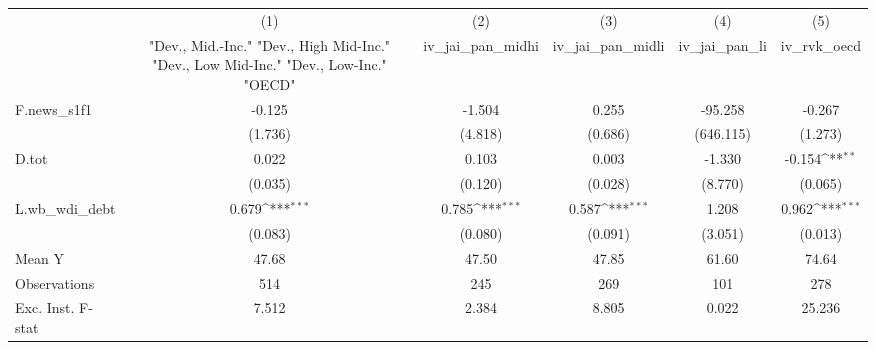 {
\def\sym#1{\ifmmode^{#1}\else\(^{#1}\)\fi}
\begin{tabular}{l*{5}{c}}
\toprule
            &\multicolumn{1}{c}{(1)}&\multicolumn{1}{c}{(2)}&\multicolumn{1}{c}{(3)}&\multicolumn{1}{c}{(4)}&\multicolumn{1}{c}{(5)}\\
            &\multicolumn{1}{c}{ "Dev., Mid.-Inc." "Dev., High Mid-Inc." "Dev., Low Mid-Inc." "Dev., Low-Inc." "OECD" }&\multicolumn{1}{c}{iv\_jai\_pan\_midhi}&\multicolumn{1}{c}{iv\_jai\_pan\_midli}&\multicolumn{1}{c}{iv\_jai\_pan\_li}&\multicolumn{1}{c}{iv\_rvk\_oecd}\\
\midrule
F.news\_s1f1 &      -0.125         &      -1.504         &       0.255         &     -95.258         &      -0.267         \\
            &     (1.736)         &     (4.818)         &     (0.686)         &   (646.115)         &     (1.273)         \\
\addlinespace
D.tot       &       0.022         &       0.103         &       0.003         &      -1.330         &      -0.154\sym{**} \\
            &     (0.035)         &     (0.120)         &     (0.028)         &     (8.770)         &     (0.065)         \\
\addlinespace
L.wb\_wdi\_debt&       0.679\sym{***}&       0.785\sym{***}&       0.587\sym{***}&       1.208         &       0.962\sym{***}\\
            &     (0.083)         &     (0.080)         &     (0.091)         &     (3.051)         &     (0.013)         \\
\midrule
Mean Y      &       47.68         &       47.50         &       47.85         &       61.60         &       74.64         \\
Observations&         514         &         245         &         269         &         101         &         278         \\
Exc. Inst. F-stat&       7.512         &       2.384         &       8.805         &       0.022         &      25.236         \\
\bottomrule
\end{tabular}
}
